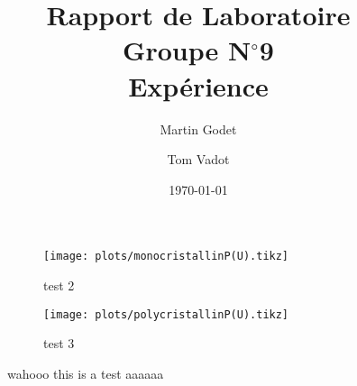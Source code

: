 \documentclass[a4paper, 12pt, oneside]{article}
\begin{document}
\title{Rapport de Laboratoire\\Groupe N$^\circ$9\\Expérience}
\author{Martin Godet \and Tom Vadot}
\date{\today}

\maketitle

\begin{figure}
    \centering
    \begin{subfigure}[c]{0.4\linewidth}
        \centering
        \texttt{[image: plots/monocristallinP(U).tikz]}
        \label{fig:1b}
        \caption{test 2}
    \end{subfigure}
    \begin{subfigure}[c]{0.4\linewidth}
        \centering
        \texttt{[image: plots/polycristallinP(U).tikz]}
        \label{fig:1c}
        \caption{test 3}
    \end{subfigure}
    \caption{wahooo this is a test aaaaaa}
\end{figure}







\nocite{*}  %
\printbibliography

\newpage

\begin{appendices}

\end{appendices}
\end{document}
